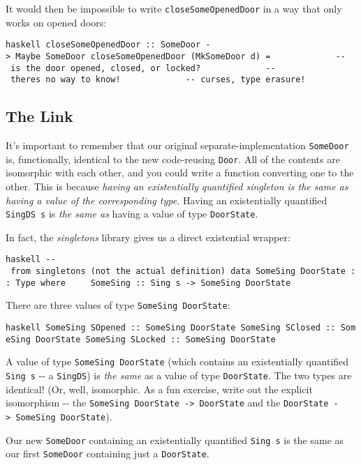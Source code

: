 \documentclass[]{article}
\begin{document}
It would then be impossible to write \texttt{closeSomeOpenedDoor} in a way that
only works on opened doors:

\texttt{haskell\ closeSomeOpenedDoor\ ::\ SomeDoor\ -\textgreater{}\ Maybe\ SomeDoor\ closeSomeOpenedDoor\ (MkSomeDoor\ d)\ =\ \ \ \ \ \ \ \ \ \ \ \ \ -\/-\ is\ the\ door\ opened,\ closed,\ or\ locked?\ \ \ \ \ \ \ \ \ \ \ \ \ -\/-\ there\textquotesingle{}s\ no\ way\ to\ know!\ \ \ \ \ \ \ \ \ \ \ \ \ -\/-\ curses,\ type\ erasure!}

\subsection{The Link}

It's important to remember that our original separate-implementation
\texttt{SomeDoor} is, functionally, identical to the new code-reusing
\texttt{Door}. All of the contents are isomorphic with each other, and you could
write a function converting one to the other. This is because \emph{having an
existentially quantified singleton is the same as having a value of the
corresponding type.} Having an existentially quantified \texttt{SingDS\ s} is
\emph{the same as} having a value of type \texttt{DoorState}.

In fact, the \emph{singletons} library gives us a direct existential wrapper:

\texttt{haskell\ -\/-\ from\ singletons\ (not\ the\ actual\ definition)\ data\ SomeSing\ DoorState\ ::\ Type\ where\ \ \ \ \ SomeSing\ ::\ Sing\ s\ -\textgreater{}\ SomeSing\ DoorState}

There are three values of type \texttt{SomeSing\ DoorState}:

\texttt{haskell\ SomeSing\ SOpened\ ::\ SomeSing\ DoorState\ SomeSing\ SClosed\ ::\ SomeSing\ DoorState\ SomeSing\ SLocked\ ::\ SomeSing\ DoorState}

A value of type \texttt{SomeSing\ DoorState} (which contains an existentially
quantified \texttt{Sing\ s} -\/- a \texttt{SingDS}) is \emph{the same} as a
value of type \texttt{DoorState}. The two types are identical! (Or, well,
isomorphic. As a fun exercise, write out the explicit isomorphism -\/- the
\texttt{SomeSing\ DoorState\ -\textgreater{}\ DoorState} and the
\texttt{DoorState\ -\textgreater{}\ SomeSing\ DoorState}).

Our new \texttt{SomeDoor} containing an existentially quantified
\texttt{Sing\ s} is the same as our first \texttt{SomeDoor} containing just a
\texttt{DoorState}.
\end{document}
